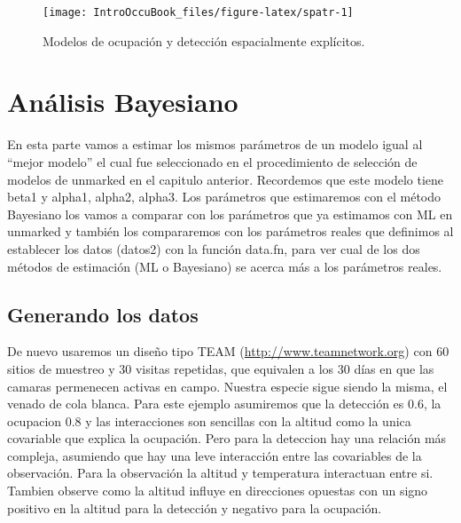 \documentclass[
]{book}
\newenvironment{Shaded}{\begin{snugshade}}{\end{snugshade}}
\newcommand{\CommentTok}[1]{\textcolor[rgb]{0.56,0.35,0.01}{\textit{#1}}}
\newcommand{\KeywordTok}[1]{\textcolor[rgb]{0.13,0.29,0.53}{\textbf{#1}}}
\newcommand{\NormalTok}[1]{#1}
\newcommand{\OperatorTok}[1]{\textcolor[rgb]{0.81,0.36,0.00}{\textbf{#1}}}
\newcommand{\StringTok}[1]{\textcolor[rgb]{0.31,0.60,0.02}{#1}}
\begin{document}
\begin{Shaded}
\end{Shaded}

\begin{figure}
\texttt{[image: IntroOccuBook\_files/figure-latex/spatr-1]} \caption[fig.]{Modelos de ocupación y detección espacialmente explícitos.}\label{fig:spatr}
\end{figure}

\hypertarget{bayesian}{%
\chapter{Análisis Bayesiano}\label{bayesian}}

En esta parte vamos a estimar los mismos parámetros de un modelo igual al ``mejor modelo'' el cual fue seleccionado en el procedimiento de selección de modelos de unmarked en el capitulo anterior. Recordemos que este modelo tiene beta1 y alpha1, alpha2, alpha3. Los parámetros que estimaremos con el método Bayesiano los vamos a comparar con los parámetros que ya estimamos con ML en unmarked y también los compararemos con los parámetros reales que definimos al establecer los datos (datos2) con la función data.fn, para ver cual de los dos métodos de estimación (ML o Bayesiano) se acerca más a los parámetros reales.

\hypertarget{generando-los-datos-1}{%
\section{Generando los datos}\label{generando-los-datos-1}}

De nuevo usaremos un diseño tipo TEAM (\url{http://www.teamnetwork.org}) con 60 sitios de muestreo y 30 visitas repetidas, que equivalen a los 30 días en que las camaras permenecen activas en campo. Nuestra especie sigue siendo la misma, el venado de cola blanca. Para este ejemplo asumiremos que la detección es 0.6, la ocupacion 0.8 y las interacciones son sencillas con la altitud como la unica covariable que explica la ocupación. Pero para la deteccion hay una relación más compleja, asumiendo que hay una leve interacción entre las covariables de la observación. Para la observación la altitud y temperatura interactuan entre si. Tambien observe como la altitud influye en direcciones opuestas con un signo positivo en la altitud para la detección y negativo para la ocupación.
\end{document}
